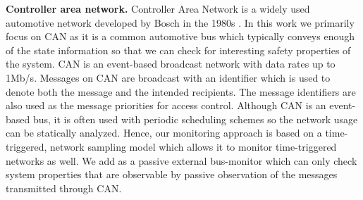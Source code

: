 

\vspace*{3pt}
\noindent
\textbf{Controller area network.} Controller Area Network is a
widely used automotive network developed by Bosch
in the 1980s \cite{Bosch1991}. In this work we  primarily focus on CAN as
it is a common automotive bus which typically conveys enough of the state
information so that we can check for interesting safety properties of the system.
CAN is an event-based broadcast network with data rates up to 1Mb/s.
Messages on CAN are broadcast with an identifier which is used to denote
both the message and the intended recipients.
The message identifiers are also used as the message priorities for access control.
Although CAN is an event-based bus,
it is often used with periodic scheduling schemes so the network usage can be statically
analyzed. Hence, our monitoring approach is based on a time-triggered, network sampling
model which allows it to monitor time-triggered networks as well.
We add \monitor as a
passive external bus-monitor which can only check system properties
that are observable by passive
observation of the messages transmitted through CAN.




